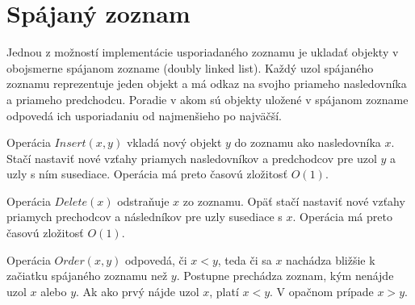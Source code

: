 \documentclass[
  digital,     %
  oneside,     %
  nosansbold,  %
  nocolorbold, %
  lof,         %
  lot,         %
]{fithesis4}
\begin{document}





\chapter{Spájaný zoznam}

Jednou z možností implementácie usporiadaného zoznamu je ukladať objekty v obojsmerne spájanom zozname (doubly linked list). Každý uzol spájaného zoznamu reprezentuje jeden objekt a má odkaz na svojho priameho nasledovníka a priameho predchodcu. Poradie v akom sú objekty uložené v spájanom zozname odpovedá ich usporiadaniu od najmenšieho po najväčší.

Operácia $Insert(x, y)$ vkladá nový objekt $y$ do zoznamu ako nasledovníka $x$. Stačí nastaviť nové vzťahy priamych nasledovníkov a predchodcov pre uzol $y$ a uzly s ním susediace. Operácia má preto časovú zložitosť $O(1)$.

Operácia $Delete(x)$ odstraňuje $x$ zo zoznamu. Opäť stačí nastaviť nové vzťahy priamych prechodcov a následníkov pre uzly susediace s $x$. Operácia má preto časovú zložitosť $O(1)$.

Operácia $Order(x, y)$ odpovedá, či $x < y$, teda či sa $x$ nachádza bližšie k začiatku spájaného zoznamu než $y$. Postupne prechádza zoznam, kým nenájde uzol $x$ alebo $y$. Ak ako prvý nájde uzol $x$, platí $x < y$. V opačnom prípade $x > y$.

\end{document}
